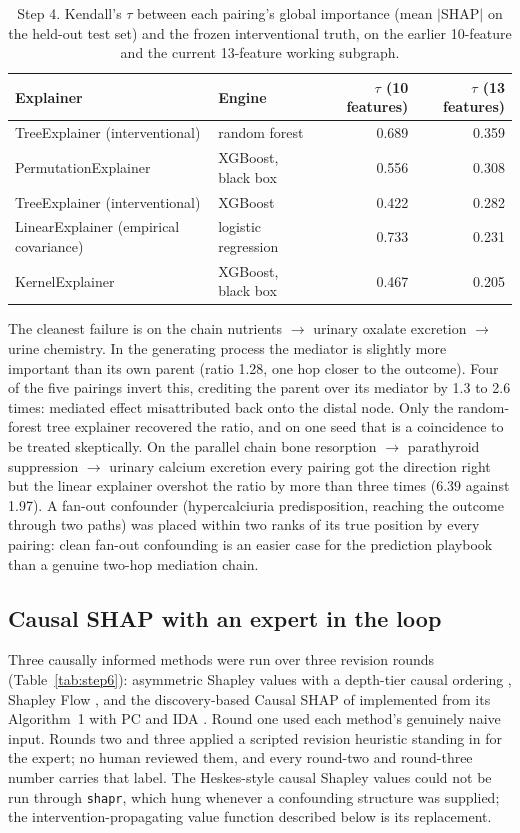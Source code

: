 \documentclass[11pt]{article}
\begin{document}
\begin{table}[htbp]
\centering
\caption{Step 4. Kendall's $\tau$ between each pairing's global importance
(mean $|$SHAP$|$ on the held-out test set) and the frozen interventional
truth, on the earlier 10-feature and the current 13-feature working
subgraph.}
\label{tab:step4}
\begin{tabular}{llrr}
\toprule
Explainer & Engine & $\tau$ (10 features) & $\tau$ (13 features)\\
\midrule
TreeExplainer (interventional) & random forest & 0.689 & 0.359\\
PermutationExplainer & XGBoost, black box & 0.556 & 0.308\\
TreeExplainer (interventional) & XGBoost & 0.422 & 0.282\\
LinearExplainer (empirical covariance) & logistic regression & 0.733 & 0.231\\
KernelExplainer & XGBoost, black box & 0.467 & 0.205\\
\bottomrule
\end{tabular}
\end{table}

The cleanest failure is on the chain nutrients $\rightarrow$ urinary oxalate
excretion $\rightarrow$ urine chemistry. In the generating process the
mediator is slightly more important than its own parent (ratio 1.28, one hop
closer to the outcome). Four of the five pairings invert this, crediting the
parent over its mediator by 1.3 to 2.6 times: mediated effect misattributed
back onto the distal node. Only the random-forest tree explainer recovered
the ratio, and on one seed that is a coincidence to be treated skeptically.
On the parallel chain bone resorption $\rightarrow$ parathyroid suppression
$\rightarrow$ urinary calcium excretion every pairing got the direction
right but the linear explainer overshot the ratio by more than three times
(6.39 against 1.97). A fan-out confounder (hypercalciuria predisposition,
reaching the outcome through two paths) was placed within two ranks of its
true position by every pairing: clean fan-out confounding is an easier case
for the prediction playbook than a genuine two-hop mediation chain.

\subsection{Causal SHAP with an expert in the loop}

Three causally informed methods were run over three revision rounds
(Table~\ref{tab:step6}): asymmetric Shapley values with a depth-tier causal
ordering \citep{Frye2020}, Shapley Flow \citep{Wang2021}, and the
discovery-based Causal SHAP of \citet{Ng2025} implemented from its Algorithm~1
with PC and IDA \citep{Kalisch2012}. Round one used each method's genuinely
naive input. Rounds two and three applied a scripted revision heuristic
standing in for the expert; no human reviewed them, and every round-two and
round-three number carries that label. The Heskes-style causal Shapley
values \citep{Heskes2020} could not be run through \texttt{shapr}, which
hung whenever a confounding structure was supplied; the intervention-propagating
value function described below is its replacement.
\end{document}

